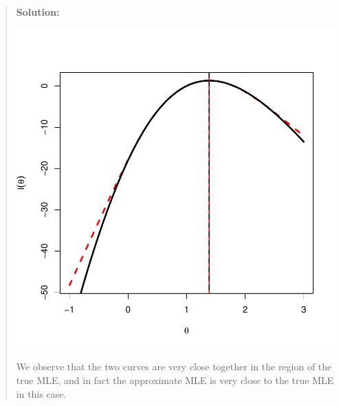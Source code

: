 \documentclass{article}
\begin{document}
\begin{enumerate}
\begin{enumerate}
\begin{quotation}{\bf Solution:}
\begin{Schunk}
\end{Schunk}
\includegraphics{sol10-010}

      We observe that the two curves are very close together in the region of the
      true MLE, and in fact the approximate MLE is very close to
      the true MLE in this case.
      \end{quotation}
      

\end{enumerate}
\end{enumerate}
\end{document}
